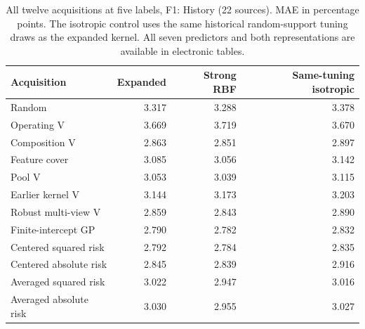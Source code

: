 \begin{table}[htbp]\centering\small
\caption{All twelve acquisitions at five labels, F1: History (22 sources). MAE in percentage points. The isotropic control uses the same historical random-support tuning draws as the expanded kernel. All seven predictors and both representations are available in electronic tables.}\label{tab:step10all0}
\begin{tabular}{lrrr}\toprule
Acquisition & Expanded & Strong RBF & Same-tuning isotropic \\ \midrule
Random & 3.317 & 3.288 & 3.378 \\
Operating V & 3.669 & 3.719 & 3.670 \\
Composition V & 2.863 & 2.851 & 2.897 \\
Feature cover & 3.085 & 3.056 & 3.142 \\
Pool V & 3.053 & 3.039 & 3.115 \\
Earlier kernel V & 3.144 & 3.173 & 3.203 \\
Robust multi-view V & 2.859 & 2.843 & 2.890 \\
Finite-intercept GP & 2.790 & 2.782 & 2.832 \\
Centered squared risk & 2.792 & 2.784 & 2.835 \\
Centered absolute risk & 2.845 & 2.839 & 2.916 \\
Averaged squared risk & 3.022 & 2.947 & 3.016 \\
Averaged absolute risk & 3.030 & 2.955 & 3.027 \\
\bottomrule\end{tabular}
\end{table}
